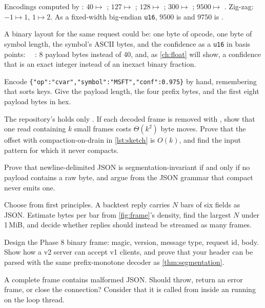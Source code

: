 \begin{verified}
Encodings computed by : $40\mapsto$ ; $127\mapsto$ ;
$128\mapsto$ ; $300\mapsto$ ; $9500\mapsto$ . Zig-zag: $-1\mapsto1$, $1\mapsto2$.
As a fixed-width big-endian \texttt{u16}, $9500$ is  and $9750$ is .
\end{verified}

A binary layout for the same request could be: one byte of opcode, one byte of symbol length, the symbol's ASCII bytes,
and the confidence as a \texttt{u16} in basis points:
\,\textbar\,\,\textbar\,\,\textbar\,: 8 payload bytes instead of 40, and, as
\cref{ch:float} will show, a confidence that is an exact integer instead of an inexact binary fraction.


\begin{exercises}
 Encode \texttt{\{"op":"cvar","symbol":"MSFT","conf":0.975\}} by hand, remembering that
 sorts keys. Give the payload length, the four prefix bytes, and the first eight payload bytes in hex.

 The repository's  holds only . If each
decoded frame is removed with , show that one read containing $k$ small frames
costs $\Theta(k^2)$ byte moves. Prove that the  offset with compaction-on-drain in \cref{lst:sketch} is $O(k)$,
and find the input pattern for which it never compacts.

 Prove that newline-delimited JSON is segmentation-invariant if and only if no payload contains a raw
 byte, and argue from the JSON grammar that compact  never emits one.

 Choose  from first principles. A backtest reply carries $N$ bars of six fields as
JSON. Estimate bytes per bar from \cref{fig:frame}'s density, find the largest $N$ under 1\,MiB, and decide whether
replies should instead be streamed as many frames.

 Design the Phase 8 binary frame: magic, version, message type, request id, body. Show how a v2 server
can accept v1 clients, and prove that your header can be parsed with the same prefix-monotone decoder as
\cref{thm:segmentation}.

 A complete frame contains malformed JSON. Should  throw, return an error frame, or
close the connection? Consider that it is called from inside an  running on the loop thread.
\end{exercises}


